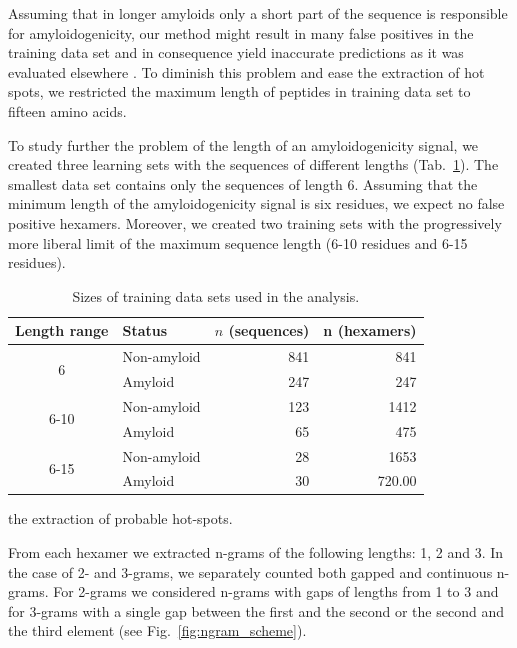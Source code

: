 \documentclass[a4,center,fleqn]{NAR}
\begin{document}
  Assuming that in longer amyloids only a short part of the sequence is 
responsible for amyloidogenicity, our method might result in many false 
positives in the training data set and in consequence yield inaccurate 
predictions as it was evaluated elsewhere \citep{kotulska_amyloid_2013}. To 
diminish this problem and ease the extraction of hot spots, we restricted the 
maximum length of peptides in training data set to fifteen amino acids.

%
%
%

  To study further the problem of the length of an amyloidogenicity signal, we 
created three learning sets with the sequences of different lengths 
(Tab.~\ref{tab:training_sets}). The smallest data set contains only the 
sequences of length 6. Assuming that the minimum length of the amyloidogenicity 
signal is six residues, we expect no false positive hexamers. Moreover, we 
created two training sets with the progressively more liberal limit of the 
maximum sequence length (6-10 residues and 6-15 residues).

\begin{table}[]
\centering
\caption{Sizes of training data sets used in the analysis.}
\label{tab:training_sets}
\begin{tabular}{clrr}
\hline
Length range & Status & $n$ (sequences) & n (hexamers) \\ \hline
\multirow{2}{*}{6} & Non-amyloid & 841 & 841 \\
 & Amyloid & 247 & 247 \\
\hline
\multirow{2}{*}{6-10} & Non-amyloid & 123 & 1412 \\
 & Amyloid & 65 & 475 \\
\hline
\multirow{2}{*}{6-15} & Non-amyloid & 28 & 1653 \\
 & Amyloid & 30 & 720.00 \\
\hline
\end{tabular}
\end{table}

%
%
%
the extraction of probable hot-spots.

  From each hexamer we extracted n-grams of the following lengths: 1, 2 and 3. In 
the case of 2- and 3-grams, we separately counted both gapped and continuous 
n-grams. For 2-grams we considered n-grams with gaps of lengths from 1 to 3 and for 
%
%
%
3-grams with a single gap between the first and the second or the second and the 
third element (see Fig.~\ref{fig:ngram_scheme}).
\end{document}
